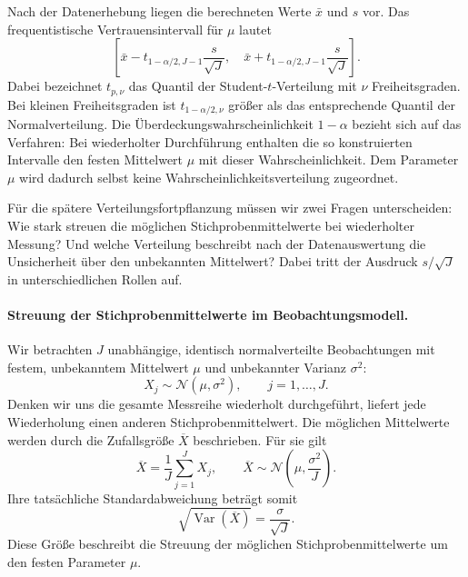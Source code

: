 Nach der Datenerhebung liegen die berechneten Werte $\bar x$ und $s$
vor. Das frequentistische Vertrauensintervall für $\mu$ lautet
\begin{equation}
\left[
\bar x-t_{1-\alpha/2,J-1}\frac{s}{\sqrt J},
\quad
\bar x+t_{1-\alpha/2,J-1}\frac{s}{\sqrt J}
\right].
\end{equation}
Dabei bezeichnet $t_{p,\nu}$ das Quantil der Student-$t$-Verteilung
mit $\nu$ Freiheitsgraden. Bei kleinen Freiheitsgraden ist
$t_{1-\alpha/2,\nu}$ größer als das entsprechende Quantil der Normalverteilung.
Die Überdeckungswahrscheinlichkeit $1-\alpha$ bezieht sich auf
das Verfahren: Bei wiederholter Durchführung enthalten die so
konstruierten Intervalle den festen Mittelwert $\mu$ mit dieser
Wahrscheinlichkeit. Dem Parameter $\mu$ wird dadurch selbst
keine Wahrscheinlichkeitsverteilung zugeordnet.

Für die spätere Verteilungsfortpflanzung müssen wir zwei Fragen
unterscheiden: Wie stark streuen die möglichen Stichprobenmittelwerte
bei wiederholter Messung? Und welche Verteilung beschreibt nach der
Datenauswertung die Unsicherheit über den unbekannten Mittelwert?
Dabei tritt der Ausdruck $s/\sqrt J$ in unterschiedlichen Rollen auf.

\paragraph{Streuung der Stichprobenmittelwerte im Beobachtungsmodell.}

Wir betrachten $J$ unabhängige, identisch normalverteilte
Beobachtungen mit festem, unbekanntem Mittelwert $\mu$ und
unbekannter Varianz $\sigma^2$:
\begin{equation}
X_j\sim\mathcal N(\mu,\sigma^2),
\qquad j=1,\dots,J.
\end{equation}
Denken wir uns die gesamte Messreihe wiederholt durchgeführt,
liefert jede Wiederholung einen anderen Stichprobenmittelwert.
Die möglichen Mittelwerte werden durch die Zufallsgröße
$\overline X$ beschrieben. Für sie gilt
\begin{equation}
\overline X=\frac{1}{J}\sum_{j=1}^{J}X_j,
\qquad
\overline X\sim
\mathcal N\!\left(\mu,\frac{\sigma^2}{J}\right).
\end{equation}
Ihre tatsächliche Standardabweichung beträgt somit
\begin{equation}
\sqrt{\operatorname{Var}(\overline X)}
=
\frac{\sigma}{\sqrt J}.
\end{equation}
Diese Größe beschreibt die Streuung der möglichen
Stichprobenmittelwerte um den festen Parameter $\mu$.

